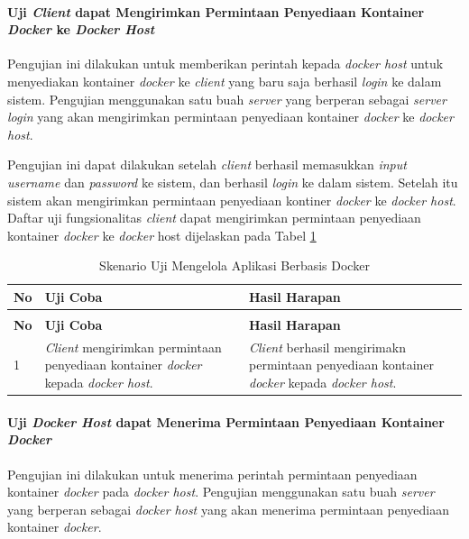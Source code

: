 \paragraph{Uji \textit{Client} dapat Mengirimkan Permintaan Penyediaan Kontainer \textit{Docker} ke \textit{Docker Host}} \label{kedua}
Pengujian ini dilakukan untuk memberikan perintah kepada \textit{docker host} untuk menyediakan kontainer \textit{docker} ke \textit{client} yang baru saja berhasil \textit{login} ke dalam sistem. Pengujian menggunakan satu buah \textit{server} yang berperan sebagai \textit{server login} yang akan mengirimkan permintaan penyediaan kontainer \textit{docker} ke \textit{docker host}.

Pengujian ini dapat dilakukan setelah \textit{client} berhasil memasukkan \textit{input username} dan \textit{password} ke sistem, dan berhasil \textit{login} ke dalam sistem. Setelah itu sistem akan mengirimkan permintaan penyediaan kontiner \textit{docker} ke \textit{docker host}. Daftar uji fungsionalitas \textit{client} dapat mengirimkan permintaan penyediaan kontainer \textit{docker} ke \textit{docker} host dijelaskan pada Tabel \ref{ujicoba2}

\begin{longtable}{|p{}|p{}|p{}|}					\caption{Skenario Uji \textit{Client} dapat \textit{Login} Mengirimkan Permintaan Penyediaan Kontainer \textit{Docker}} \label{ujicoba2} \\
	\hline
	\textbf{No} & \textbf{Uji Coba} & \textbf{Hasil Harapan} \\ \hline
	\endfirsthead
	\caption[]{Skenario Uji Mengelola Aplikasi Berbasis Docker} \\
	\hline
	\textbf{No} & \textbf{Uji Coba} & \textbf{Hasil Harapan} \\ \hline
	\endhead
	\endfoot
	\endlastfoot
	
	1 & \textit{Client} mengirimkan permintaan penyediaan kontainer \textit{docker} kepada \textit{docker host}. & \textit{Client} berhasil mengirimakn permintaan penyediaan kontainer \textit{docker} kepada \textit{docker host}.\\ \hline
\end{longtable}

\paragraph{Uji \textit{Docker Host} dapat Menerima Permintaan Penyediaan Kontainer \textit{Docker}} \label{ketiga}
Pengujian ini dilakukan untuk menerima perintah permintaan penyediaan kontainer \textit{docker} pada \textit{docker host}. Pengujian menggunakan satu buah \textit{server} yang berperan sebagai \textit{docker host} yang akan menerima permintaan penyediaan kontainer \textit{docker}.

